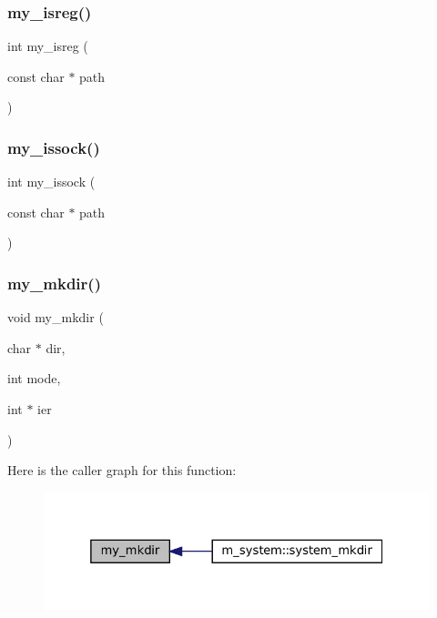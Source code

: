 \subsubsection{\texorpdfstring{my\+\_\+isreg()}{my\_isreg()}}
{\footnotesize\ttfamily int my\+\_\+isreg (\begin{DoxyParamCaption}\item[{const char $\ast$}]{path }\end{DoxyParamCaption})}

\mbox{\label{C-M__system_8c_a090bd041de7e5661c0cb3dea61517283}} 
\subsubsection{\texorpdfstring{my\+\_\+issock()}{my\_issock()}}
{\footnotesize\ttfamily int my\+\_\+issock (\begin{DoxyParamCaption}\item[{const char $\ast$}]{path }\end{DoxyParamCaption})}

\mbox{\label{C-M__system_8c_a21b228b36ba6064c95e68c484f92eaf8}} 
\subsubsection{\texorpdfstring{my\+\_\+mkdir()}{my\_mkdir()}}
{\footnotesize\ttfamily void my\+\_\+mkdir (\begin{DoxyParamCaption}\item[{char $\ast$}]{dir,  }\item[{int}]{mode,  }\item[{int $\ast$}]{ier }\end{DoxyParamCaption})}

Here is the caller graph for this function\+:
\nopagebreak
\begin{figure}[H]
\begin{center}
\leavevmode
\includegraphics[width=325pt]{C-M__system_8c_a21b228b36ba6064c95e68c484f92eaf8_icgraph}
\end{center}
\end{figure}
\mbox{\label{C-M__system_8c_a91bcacc76b5a33845775f92e9608ac9c}} 
